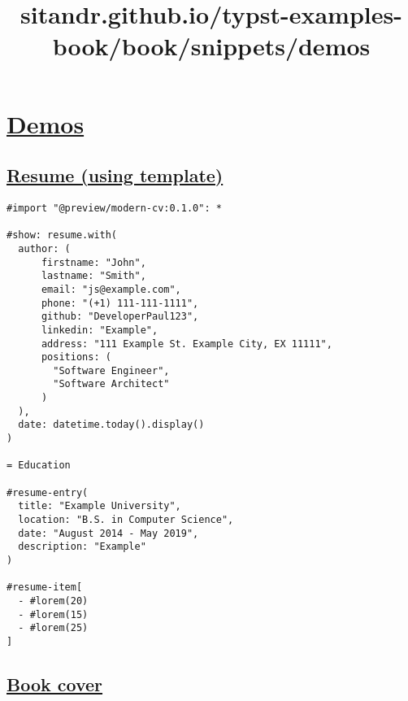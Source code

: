 \title{sitandr.github.io/typst-examples-book/book/snippets/demos}

\section{\texorpdfstring{\hyperref[demos]{Demos}}{Demos}}\label{demos}

\subsection{\texorpdfstring{\hyperref[resume-using-template]{Resume
(using
template)}}{Resume (using template)}}\label{resume-using-template}

\begin{verbatim}
#import "@preview/modern-cv:0.1.0": *

#show: resume.with(
  author: (
      firstname: "John", 
      lastname: "Smith",
      email: "js@example.com", 
      phone: "(+1) 111-111-1111",
      github: "DeveloperPaul123",
      linkedin: "Example",
      address: "111 Example St. Example City, EX 11111",
      positions: (
        "Software Engineer",
        "Software Architect"
      )
  ),
  date: datetime.today().display()
)

= Education

#resume-entry(
  title: "Example University",
  location: "B.S. in Computer Science",
  date: "August 2014 - May 2019",
  description: "Example"
)

#resume-item[
  - #lorem(20)
  - #lorem(15)
  - #lorem(25)
]
\end{verbatim}

\pandocbounded{}

\subsection{\texorpdfstring{\hyperref[book-cover]{Book
cover}}{Book cover}}\label{book-cover}

